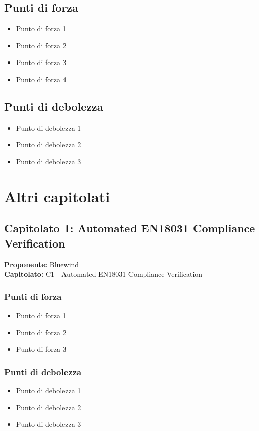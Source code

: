 \documentclass[a4paper,12pt]{article}
\begin{document}
\subsection{Punti di forza}
\begin{itemize}
\item Punto di forza 1
\item Punto di forza 2
\item Punto di forza 3
\item Punto di forza 4
\end{itemize}

\subsection{Punti di debolezza}
\begin{itemize}
\item Punto di debolezza 1
\item Punto di debolezza 2
\item Punto di debolezza 3
\end{itemize}

\newpage

\section{Altri capitolati}

\subsection{Capitolato 1: Automated EN18031 Compliance Verification}

\begin{tcolorbox}[colback=lightgray!30,colframe=darkgray,arc=2mm,boxrule=0.3pt]
\textbf{Proponente:} Bluewind \\
\textbf{Capitolato:} C1 - Automated EN18031 Compliance Verification
\end{tcolorbox}

\subsubsection{Punti di forza}
\begin{itemize}
\item Punto di forza 1
\item Punto di forza 2
\item Punto di forza 3
\end{itemize}

\subsubsection{Punti di debolezza}
\begin{itemize}
\item Punto di debolezza 1
\item Punto di debolezza 2
\item Punto di debolezza 3
\end{itemize}
\end{document}
